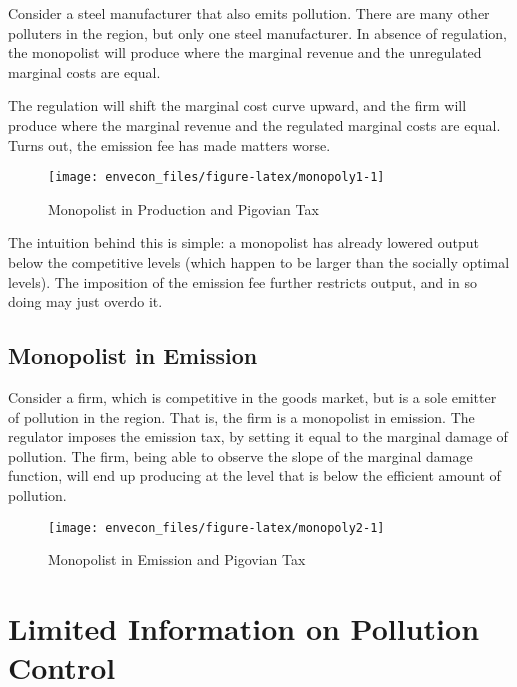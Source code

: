 \documentclass[
]{book}
\begin{document}
Consider a steel manufacturer that also emits pollution. There are many other polluters in the region, but only one steel manufacturer. In absence of regulation, the monopolist will produce where the marginal revenue and the unregulated marginal costs are equal.

The regulation will shift the marginal cost curve upward, and the firm will produce where the marginal revenue and the regulated marginal costs are equal. Turns out, the emission fee has made matters worse.

\begin{figure}

{\centering \texttt{[image: envecon\_files/figure-latex/monopoly1-1]} 

}

\caption{Monopolist in Production and Pigovian Tax}\label{fig:monopoly1}
\end{figure}

The intuition behind this is simple: a monopolist has already lowered output below the competitive levels (which happen to be larger than the socially optimal levels). The imposition of the emission fee further restricts output, and in so doing may just overdo it.

\hypertarget{monopolist-in-emission}{%
\subsection{Monopolist in Emission}\label{monopolist-in-emission}}

Consider a firm, which is competitive in the goods market, but is a sole emitter of pollution in the region. That is, the firm is a monopolist in emission. The regulator imposes the emission tax, by setting it equal to the marginal damage of pollution. The firm, being able to observe the slope of the marginal damage function, will end up producing at the level that is below the efficient amount of pollution.

\begin{figure}

{\centering \texttt{[image: envecon\_files/figure-latex/monopoly2-1]} 

}

\caption{Monopolist in Emission and Pigovian Tax}\label{fig:monopoly2}
\end{figure}

\hypertarget{limited-information-on-pollution-control}{%
\section{Limited Information on Pollution Control}\label{limited-information-on-pollution-control}}
\end{document}
